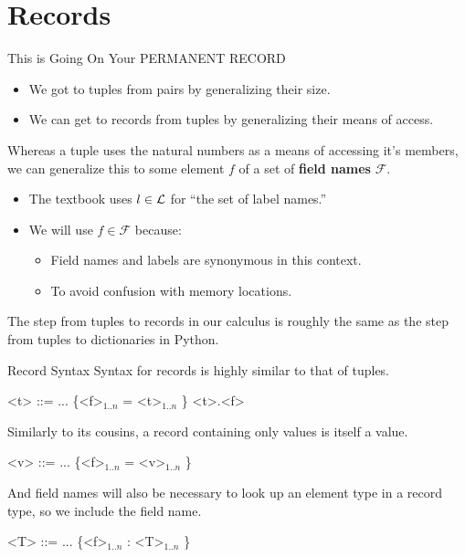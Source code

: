 \documentclass[11pt]{beamer}
\begin{document}
\section[Records]{Records}
\begin{frame}[fragile=singleslide]{This is Going On Your PERMANENT RECORD}
\begin{itemize}
\item We got to tuples from pairs by generalizing their size.  
\item We can get to records from tuples by generalizing their means of access.
\end{itemize}
Whereas a tuple uses the natural numbers as a means of accessing it's members, we can generalize this to some element $f$ of a set of \textbf{field names} $\mathcal{F}$.
\begin{itemize}
\item The textbook uses $\mathnormal{l} \in \mathcal{L}$ for ``the set of label names.''
\item We will use $f \in \mathcal{F}$ because:
\begin{itemize}
\item Field names and labels are synonymous in this context.
\item To avoid confusion with memory locations.
\end{itemize}
\end{itemize}
The step from tuples to records in our calculus is roughly the same as the step from tuples to dictionaries in Python.  
\end{frame}


\begin{frame}[fragile=singleslide]{Record Syntax}
Syntax for records is highly similar to that of tuples.
\begin{grammar}
<t> ::= ...
\alt \{<f>$_{1..n}$ = <t>$_{1..n}$ \}
\alt <t>.<f>
\end{grammar}
Similarly to its cousins, a record containing only values is itself a value.
\begin{grammar}
<v> ::= ...
\alt \{<f>$_{1..n}$ = <v>$_{1..n}$ \}
\end{grammar}
And field names will also be necessary to look up an element type in a record type, so we include the field name.
\begin{grammar}
<T> ::= ...
\alt \{<f>$_{1..n}$ : <T>$_{1..n}$ \}
\end{grammar}

\end{frame}
\end{document}
